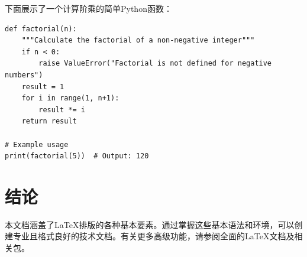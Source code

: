 \documentclass[12pt,a4paper]{ctexart}
\begin{document}
下面展示了一个计算阶乘的简单Python函数：
\begin{lstlisting}
def factorial(n):
    """Calculate the factorial of a non-negative integer"""
    if n < 0:
        raise ValueError("Factorial is not defined for negative numbers")
    result = 1
    for i in range(1, n+1):
        result *= i
    return result

# Example usage
print(factorial(5))  # Output: 120
\end{lstlisting}

\section{结论}
\label{sec:conclusion}

本文档涵盖了LaTeX排版的各种基本要素。通过掌握这些基本语法和环境，可以创建专业且格式良好的技术文档。有关更多高级功能，请参阅全面的LaTeX文档及相关包。



\end{document}

